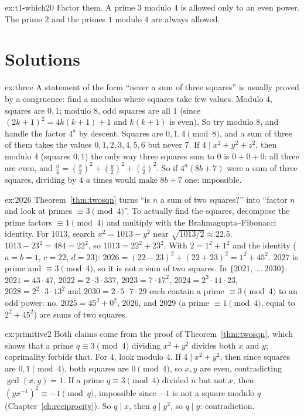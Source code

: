 \begin{hint}{ex:t1-which20}
Factor them. A prime $3$ modulo $4$ is allowed only to an even power. The prime $2$ and the primes $1$ modulo $4$ are always allowed.
\end{hint}

\section{Solutions}

\begin{solution}{ex:three}
\idea A statement of the form ``never a sum of three squares'' is usually proved by a congruence: find a modulus where squares take few values. Modulo $4$, squares are $0,1$; modulo $8$, odd squares are all $1$ (since $(2k+1)^2=4k(k+1)+1$ and $k(k+1)$ is even). So try modulo $8$, and handle the factor $4^a$ by descent.
\writeup Squares are $0,1,4\pmod8$, and a sum of three of them takes the values $0,1,2,3,4,5,6$ but never $7$. If $4\mid x^2+y^2+z^2$, then modulo $4$ (squares $0,1$) the only way three squares sum to $0$ is $0+0+0$: all three are even, and $\frac n4=\left(\frac x2\right)^2+\left(\frac y2\right)^2+\left(\frac z2\right)^2$. So if $4^a(8b+7)$ were a sum of three squares, dividing by $4$ $a$ times would make $8b+7$ one: impossible.
\end{solution}

\begin{solution}{ex:2026}
\idea Theorem~\ref{thm:twosqn} turns ``is $n$ a sum of two squares?'' into ``factor $n$ and look at primes $\equiv3\pmod4$''. To actually find the squares, decompose the prime factors $\equiv1\pmod4$ and multiply with the Brahmagupta--Fibonacci identity. For $1013$, search $x^2=1013-y^2$ near $\sqrt{1013/2}\approx22.5$.
\writeup $1013-23^2=484=22^2$, so $1013=22^2+23^2$. With $2=1^2+1^2$ and the identity ($a=b=1$, $c=22$, $d=23$): $2026=(22-23)^2+(22+23)^2=1^2+45^2$. $2027$ is prime and $\equiv3\pmod4$, so it is not a sum of two squares. In $\{2021,\dots,2030\}$: $2021=43\cdot47$, $2022=2\cdot3\cdot337$, $2023=7\cdot17^2$, $2024=2^3\cdot11\cdot23$, $2028=2^2\cdot3\cdot13^2$ and $2030=2\cdot5\cdot7\cdot29$ each contain a prime $\equiv3\pmod4$ to an odd power: no. $2025=45^2+0^2$, $2026$, and $2029$ (a prime $\equiv1\pmod4$, equal to $2^2+45^2$) are sums of two squares.
\end{solution}

\begin{solution}{ex:primitive2}
\idea Both claims come from the proof of Theorem~\ref{thm:twosqn}, which shows that a prime $q\equiv3\pmod4$ dividing $x^2+y^2$ divides both $x$ and $y$; coprimality forbids that. For $4$, look modulo $4$.
\writeup If $4\mid x^2+y^2$, then since squares are $0,1\pmod4$, both squares are $0\pmod4$, so $x,y$ are even, contradicting $\gcd(x,y)=1$. If a prime $q\equiv3\pmod4$ divided $n$ but not $x$, then $\left(yx^{-1}\right)^2\equiv-1\pmod q$, impossible since $-1$ is not a square modulo $q$ (Chapter~\ref{ch:reciprocity}). So $q\mid x$, then $q\mid y^2$, so $q\mid y$: contradiction.
\end{solution}

